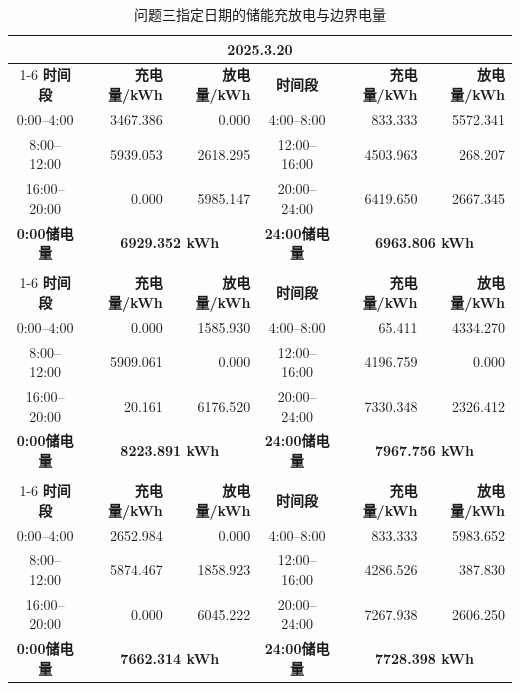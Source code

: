 \begin{table}[H]
\centering\small
\caption{问题三指定日期的储能充放电与边界电量}\label{tab:q3-specified-storage}
\renewcommand{\arraystretch}{0.72}
\begin{tabular*}{\textwidth}{@{\extracolsep{\fill}}crrcrr@{}}
\toprule
\multicolumn{6}{c}{\textbf{2025.3.20}} \\
\cmidrule(lr){1-6}
\textbf{时间段} & \textbf{充电量/kWh} & \textbf{放电量/kWh} & \textbf{时间段} & \textbf{充电量/kWh} & \textbf{放电量/kWh} \\
0:00--4:00 & 3467.386 & 0.000 & 4:00--8:00 & 833.333 & 5572.341 \\
8:00--12:00 & 5939.053 & 2618.295 & 12:00--16:00 & 4503.963 & 268.207 \\
16:00--20:00 & 0.000 & 5985.147 & 20:00--24:00 & 6419.650 & 2667.345 \\
\midrule
\textbf{0:00储电量} & \multicolumn{2}{c}{\textbf{6929.352 kWh}} & \textbf{24:00储电量} & \multicolumn{2}{c}{\textbf{6963.806 kWh}} \\
\addlinespace[4pt]
\multicolumn{6}{c}{\textbf{2025.6.21}} \\
\cmidrule(lr){1-6}
\textbf{时间段} & \textbf{充电量/kWh} & \textbf{放电量/kWh} & \textbf{时间段} & \textbf{充电量/kWh} & \textbf{放电量/kWh} \\
0:00--4:00 & 0.000 & 1585.930 & 4:00--8:00 & 65.411 & 4334.270 \\
8:00--12:00 & 5909.061 & 0.000 & 12:00--16:00 & 4196.759 & 0.000 \\
16:00--20:00 & 20.161 & 6176.520 & 20:00--24:00 & 7330.348 & 2326.412 \\
\midrule
\textbf{0:00储电量} & \multicolumn{2}{c}{\textbf{8223.891 kWh}} & \textbf{24:00储电量} & \multicolumn{2}{c}{\textbf{7967.756 kWh}} \\
\addlinespace[4pt]
\multicolumn{6}{c}{\textbf{2025.9.23}} \\
\cmidrule(lr){1-6}
\textbf{时间段} & \textbf{充电量/kWh} & \textbf{放电量/kWh} & \textbf{时间段} & \textbf{充电量/kWh} & \textbf{放电量/kWh} \\
0:00--4:00 & 2652.984 & 0.000 & 4:00--8:00 & 833.333 & 5983.652 \\
8:00--12:00 & 5874.467 & 1858.923 & 12:00--16:00 & 4286.526 & 387.830 \\
16:00--20:00 & 0.000 & 6045.222 & 20:00--24:00 & 7267.938 & 2606.250 \\
\midrule
\textbf{0:00储电量} & \multicolumn{2}{c}{\textbf{7662.314 kWh}} & \textbf{24:00储电量} & \multicolumn{2}{c}{\textbf{7728.398 kWh}} \\

\end{tabular*}
\end{table}
